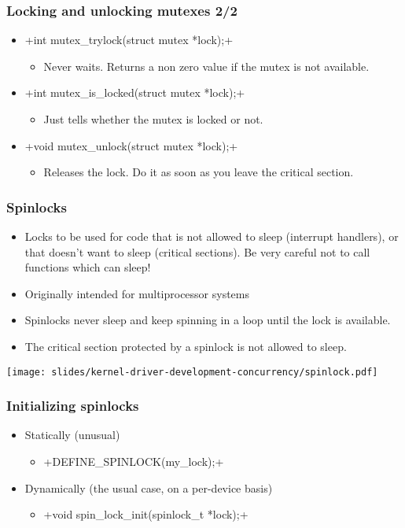 \begin{frame}[fragile]
  \frametitle{Locking and unlocking mutexes 2/2}
  \begin{itemize}
  \item {}+int mutex_trylock(struct mutex *lock);+
    \begin{itemize}
    \item Never waits. Returns a non zero value if the mutex is not
      available.
    \end{itemize}
  \item {}+int mutex_is_locked(struct mutex *lock);+
    \begin{itemize}
    \item Just tells whether the mutex is locked or not.
    \end{itemize}
  \item {}+void mutex_unlock(struct mutex *lock);+
    \begin{itemize}
    \item Releases the lock. Do it as soon as you leave the critical
      section.
    \end{itemize}
  \end{itemize}
\end{frame}

\begin{frame}
  \frametitle{Spinlocks}
  \begin{itemize}
  \item Locks to be used for code that is not allowed to sleep
    (interrupt handlers), or that doesn't want to sleep (critical
    sections). Be very careful not to call functions which can sleep!
  \item Originally intended for multiprocessor systems
  \item Spinlocks never sleep and keep spinning in a loop until the
    lock is available.
  \item The critical section protected by a spinlock is not allowed to
    sleep.
  \end{itemize}
  \begin{center}
    \texttt{[image: slides/kernel-driver-development-concurrency/spinlock.pdf]}
  \end{center}
\end{frame}

\begin{frame}[fragile]
  \frametitle{Initializing spinlocks}
  \begin{itemize}
  \item Statically (unusual)
    \begin{itemize}
    \item {}+DEFINE_SPINLOCK(my_lock);+
    \end{itemize}
  \item Dynamically (the usual case, on a per-device basis)
    \begin{itemize}
    \item {}+void spin_lock_init(spinlock_t *lock);+
    \end{itemize}
  \end{itemize}
\end{frame}

